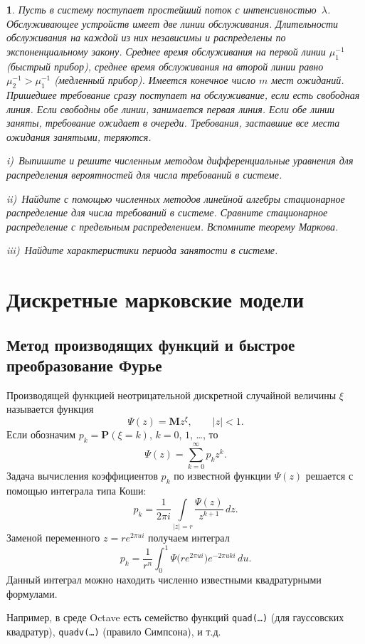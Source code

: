 \documentclass[10pt,oneside,final]{book}
\renewcommand{\Pr}{{\mathbf P}}
\newcommand{\M}{{\mathbf M}}
\newtheorem{zadacha}{}[chapter]
\begin{document}
\begin{zadacha}
  \label{z:nonhomoserv}
  Пусть в систему поступает простейший поток с
  интенсивностью~$\lambda$. Обслуживающее устройств имеет две линии
  обслуживания. Длительности обслуживания на каждой из них независимы и
  распределены по экспоненциальному закону. Среднее время обслуживания на первой
  линии $\mu_1^{-1}$ (быстрый прибор), среднее время обслуживания на второй
  линии равно $\mu_2^{-1}>\mu_1^{-1}$ (медленный прибор). Имеется конечное число
  $m$ мест ожиданий. Пришедшее требование сразу поступает на обслуживание, если
  есть свободная линия. Если свободны обе линии, занимается первая линия. Если
  обе линии заняты, требование ожидает в очереди. Требования, заставшие все
  места ожидания занятыми, теряются. \par
  \textit{i})~Выпишите и решите численным методом дифференциальные уравнения для
  распределения вероятностей для числа требований в системе. \par
  \textit{ii})~Найдите с помощью численных методов линейной алгебры стационарное
  распределение для числа требований в системе. Сравните стационарное
  распределение с предельным распределением. Вспомните теорему Маркова.\par
  \textit{iii})~Найдите характеристики периода занятости в системе.
\end{zadacha}


\chapter{Дискретные марковские модели}

\section{Метод производящих функций и быстрое преобразование Фурье}
Производящей функцией неотрицательной дискретной случайной величины $\xi$ называется функция 
\[
\Psi(z)=\M z^\xi, \qquad |z|<1.
\]
Если обозначим $p_k=\Pr(\xi=k)$, $k=0$, $1$, \ldots{}, то
\[
\Psi(z)=\sum_{k=0}^\infty p_k z^k.
\]
Задача вычисления коэффициентов $p_k$ по известной функции $\Psi(z)$ решается с
помощью интеграла типа Коши:
\[
p_k=\dfrac{1}{2\pi i}\int\limits_{|z|=r} \dfrac{\Psi(z)}{z^{k+1}}\,dz.
\]
Заменой переменного $z=re^{2\pi u i}$ получаем интеграл
\[
p_k = \dfrac{1}{r^n}\int_0^1 \Psi\bigl(r e^{2\pi u i}\bigr) e^{-2\pi u k i}\,du.
\]
Данный интеграл можно находить численно известными квадратурными формулами. 

Например, в среде Octave есть семейство функций \texttt{quad(\ldots)} (для
гауссовских квадратур),  \texttt{quadv(\ldots)} (правило Симпсона), и т.д.
\end{document}
